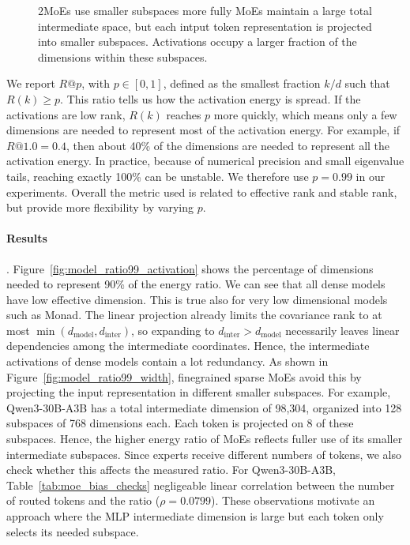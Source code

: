 \documentclass{article} %
\begin{document}
\begin{figure}
    \begin{observationbox}{2}{MoEs use smaller subspaces more fully}
    MoEs maintain a large total intermediate space, but each intput 
    token representation is projected into smaller subspaces. 
    Activations occupy a larger fraction of the dimensions within these subspaces.
    \end{observationbox}
\end{figure}
We report $R@p$, with $p \in [0,1]$, defined as the smallest fraction
$k/d$ such that $R(k) \geq p$. This ratio tells us how the activation energy is
spread. If the activations are low rank, $R(k)$ reaches $p$
more quickly, which means only a few dimensions are needed to represent most of
the activation energy. For example, if $R@1.0 = 0.4$, then about 40\% of the
dimensions are needed to represent all the activation energy. In practice,
because of numerical precision and small eigenvalue tails, reaching exactly
100\% can be unstable. We therefore use $p=0.99$ in our experiments.
Overall the metric used is related to effective rank and stable rank, but
provide more flexibility by varying $p$.


\paragraph{Results}. Figure~\ref{fig:model_ratio99_activation} shows the percentage of dimensions needed to
represent 90\% of the energy ratio. We can see that all dense models
have low effective dimension. This is true also for very low dimensional models
such as Monad. The linear projection already limits the covariance rank to at most
$\min(d_{\text{model}},d_{\text{inter}})$, so expanding to $d_{\text{inter}}>d_{\text{model}}$ 
necessarily leaves linear dependencies among the intermediate coordinates.
Hence, the intermediate activations of dense models contain a lot redundancy.
As shown in Figure~\ref{fig:model_ratio99_width}, finegrained sparse MoEs avoid this 
by projecting the input representation in different smaller subspaces.
For example, Qwen3-30B-A3B has a total intermediate dimension of 98,304, 
organized into 128 subspaces of 768 dimensions each. 
Each token is projected on 8 of these subspaces.
Hence, the higher energy ratio of MoEs reflects fuller use of its smaller intermediate subspaces.
Since experts receive different numbers of tokens, we also check whether this affects 
the measured ratio. For Qwen3-30B-A3B, Table~\ref{tab:moe_bias_checks} negligeable 
linear correlation between the number of routed tokens and the ratio ($\rho=0.0799$).
These observations motivate an approach where the MLP intermediate dimension
is large but each token only selects its needed subspace.
\end{document}
